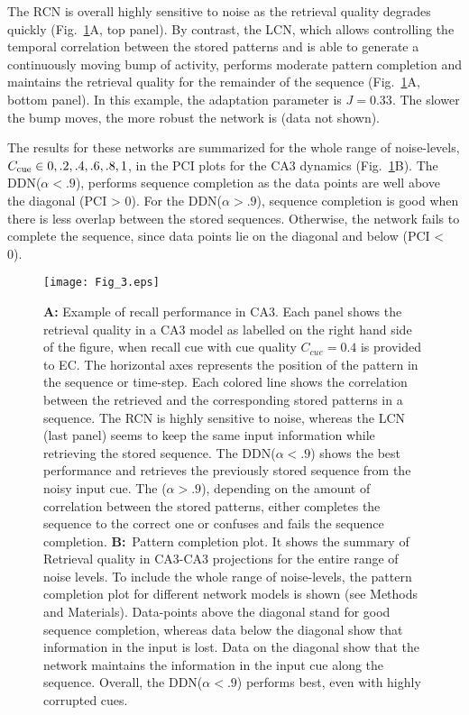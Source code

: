 \documentclass[utf8]{frontiersSCNS} %
\begin{document}
The RCN is overall highly sensitive to noise as the retrieval quality degrades quickly (Fig.~\ref{Fig_3}A, top panel). By contrast, the LCN, which allows controlling the temporal correlation between the stored patterns and is able to generate a continuously moving bump of activity, performs moderate pattern completion and maintains the retrieval quality for the remainder of the sequence (Fig.~\ref{Fig_3}A, bottom panel).
In this example, the adaptation parameter is $J = 0.33$. The slower the bump moves, the more robust the network is (data not shown).
 
The results for these networks are summarized for the whole range of noise-levels, $C_{\rm cue} \in  { 0, .2, .4, .6, .8, 1 } $, in the PCI plots for the CA3 dynamics (Fig.~\ref{Fig_3}B). 
% 
The DDN($\alpha < .9 $), performs sequence completion as the data points are well above the diagonal (PCI > 0). For the DDN($\alpha > .9 $), sequence completion is good when there is less overlap between the stored sequences. Otherwise, the network fails to complete the sequence, since data points lie on the diagonal and below (PCI < 0).  
%
\begin{figure}[!htb]
\centering\texttt{[image: Fig\_3.eps]}
\caption{\textbf{A:} Example of recall performance in CA3. 
Each panel shows the retrieval quality in a CA3 model as labelled on the right hand side of the figure, when recall cue with cue quality $C_{cue} = 0.4$ is provided to EC.
The horizontal axes represents the position of the pattern in the sequence or time-step. Each colored line shows the correlation between the retrieved and the corresponding stored patterns in a sequence.
The RCN is highly sensitive to noise, whereas the LCN (last panel) seems to keep the same input information while retrieving the stored sequence. 
The DDN($\alpha < .9$) shows the best performance and retrieves the previously stored sequence from the noisy input cue. The ($\alpha > .9$), depending on the amount of correlation between the stored patterns, either completes the sequence to the correct one or confuses and fails the sequence completion.
\textbf{B:}~Pattern completion plot. It shows the summary of Retrieval quality in CA3-CA3 projections for the entire range of noise levels.
To include the whole range of noise-levels, the pattern completion plot for different network models is shown (see Methods and Materials). Data-points above the diagonal stand for good sequence completion, whereas data below the diagonal show that information in the input is lost. Data on the diagonal show that the network maintains the information in the input cue along the sequence. Overall, the DDN($\alpha < .9$) performs best, even with highly corrupted cues. 
 }
\label{Fig_3}
\end{figure}
\end{document}
